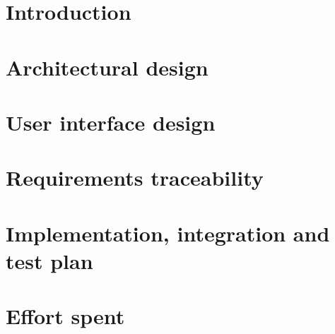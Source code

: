 \documentclass[oneside]{article}
\begin{document}
\newpage

\tableofcontents

\newpage

\section{Introduction}


\newpage

\section{Architectural design}


\section{User interface design}


\newpage

\section{Requirements traceability}

\newpage

\section{Implementation, integration and test plan}

\newpage

\section{Effort spent}

\end{document}
